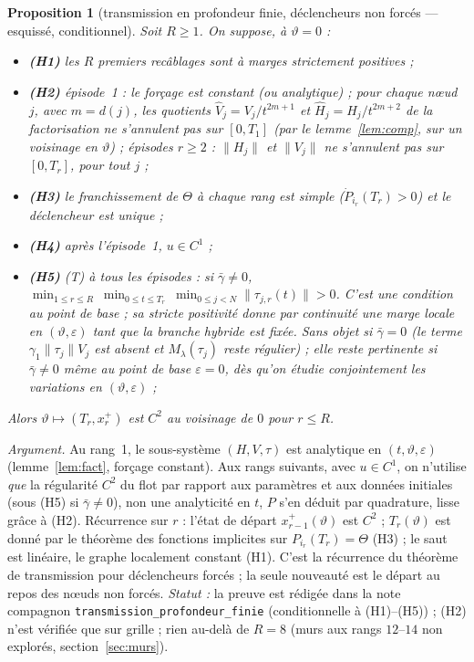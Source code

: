 \documentclass[11pt,a4paper]{article}
\newtheorem{proposition}{Proposition}
\theoremstyle{remark}
\newcommand{\vth}{\vartheta}
\begin{document}
\begin{proposition}[transmission en profondeur finie, d\'eclencheurs non forc\'es --- esquiss\'e, conditionnel]\label{prop:fini}
Soit $R\ge1$. On suppose, \`a $\vth=0$ :
\begin{itemize}[leftmargin=1.6em,itemsep=1pt]
\item \textbf{(H1)} les $R$ premiers recâblages sont \`a marges strictement positives ;
\item \textbf{(H2)} \emph{\'episode~1} : le for\c{c}age est constant (ou analytique) ; \emph{pour chaque n\oe ud $j$}, avec $m=d(j)$, les quotients $\hat V_j=V_j/t^{2m+1}$ et $\hat H_j=H_j/t^{2m+2}$ de la factorisation ne s'annulent pas sur $[0,T_1]$ (par le lemme~\ref{lem:comp}, sur un voisinage en $\vth$) ; \emph{\'episodes $r\ge2$} : $\lVert H_j\rVert$ et $\lVert V_j\rVert$ ne s'annulent pas sur $[0,T_r]$, pour tout $j$ ;
\item \textbf{(H3)} le franchissement de $\Theta$ \`a chaque rang est simple ($\dot P_{i_r}(T_r)>0$) et le d\'eclencheur est unique ;
\item \textbf{(H4)} apr\`es l'\'episode~1, $u\in C^1$ ;
\item \textbf{(H5)} (T) \`a \emph{tous} les \'episodes : si $\bar\gamma\neq0$, $\displaystyle\min_{1\le r\le R}\ \min_{0\le t\le T_r}\ \min_{0\le j<N}\lVert\tau_{j,r}(t)\rVert>0$. C'est une condition au point de base ; sa stricte positivit\'e donne par continuit\'e une marge locale en $(\vth,\varepsilon)$ tant que la branche hybride est fix\'ee. Sans objet si $\bar\gamma=0$ (le terme $\gamma_1\lVert\tau_j\rVert V_j$ est absent et $M_\lambda(\tau_j)$ reste r\'egulier) ; elle reste pertinente si $\bar\gamma\neq0$ m\^eme au point de base $\varepsilon=0$, d\`es qu'on \'etudie conjointement les variations en $(\vth,\varepsilon)$ ;
\end{itemize}
Alors $\vth\mapsto(T_r,x_r^+)$ est $C^2$ au voisinage de $0$ pour $r\le R$.
\end{proposition}
\noindent\emph{Argument.} Au rang~1, le sous-syst\`eme $(H,V,\tau)$ est analytique en $(t,\vth,\varepsilon)$ (lemme~\ref{lem:fact}, for\c{c}age constant). Aux rangs suivants, avec $u\in C^1$, on n'utilise \emph{que} la r\'egularit\'e $C^2$ du flot par rapport aux param\`etres et aux donn\'ees initiales (sous (H5) si $\bar\gamma\neq0$), non une analyticit\'e en $t$, $P$ s'en d\'eduit par quadrature, lisse gr\^ace \`a (H2). R\'ecurrence sur $r$ : l'\'etat de d\'epart $x_{r-1}^+(\vth)$ est $C^2$ ; $T_r(\vth)$ est donn\'e par le th\'eor\`eme des fonctions implicites sur $P_{i_r}(T_r)=\Theta$ (H3) ; le saut est lin\'eaire, le graphe localement constant (H1). C'est la r\'ecurrence du th\'eor\`eme de transmission pour d\'eclencheurs forc\'es ; la seule nouveaut\'e est le d\'epart au repos des n\oe uds non forc\'es. \emph{Statut :} la preuve est r\'edig\'ee dans la note compagnon \texttt{transmission\_profondeur\_finie} (conditionnelle \`a (H1)--(H5)) ; (H2) n'est v\'erifi\'ee que sur grille ; rien au-del\`a de $R=8$ (murs aux rangs $12$--$14$ non explor\'es, section~\ref{sec:murs}).
\end{document}
